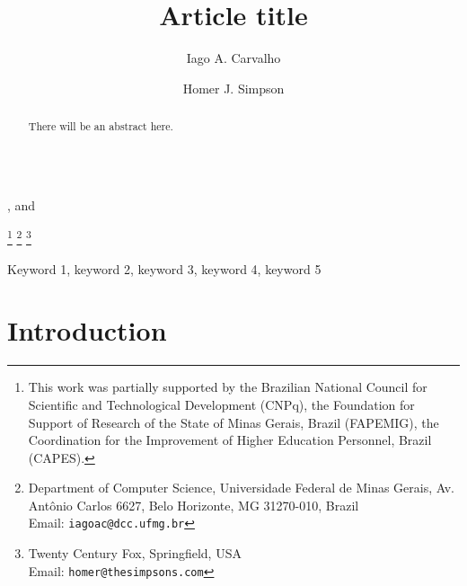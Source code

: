 \documentclass{endm}
\begin{document}
\begin{verbatim}\end{verbatim}\vspace{2.5cm}

\begin{frontmatter}

\title{Article title}

\author{Iago A. Carvalho}, and
\author{Homer J. Simpson}


\thanks[all]{This work was partially supported by the Brazilian National Council for Scientific and Technological Development (CNPq), the Foundation for Support of Research of the State of Minas Gerais, Brazil (FAPEMIG), the Coordination for the Improvement of Higher Education Personnel, Brazil (CAPES).}
\thanks[ufmg]{Department of Computer Science, Universidade Federal de Minas Gerais, Av. Antônio Carlos 6627, Belo Horizonte, MG 31270-010, Brazil \\Email: \texttt{\normalshape iagoac@dcc.ufmg.br}}
\thanks[fox]{Twenty Century Fox, Springfield, USA \\ Email:
\texttt{\normalshape homer@thesimpsons.com}}

\begin{abstract}
There will be an abstract here.
\end{abstract}

\begin{keyword}
Keyword 1, keyword 2, keyword 3, keyword 4, keyword 5
\end{keyword}

\end{frontmatter}

\section{Introduction}\label{sec:intro}



\end{document}
